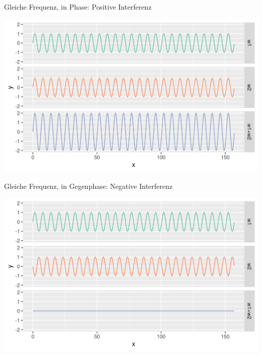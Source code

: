 \documentclass{beamer}
\begin{document}
\begin{frame}{Gleiche Frequenz, in Phase: Positive Interferenz}

\begin{center}
    \includegraphics[width=\textwidth]{positive_interferenz.png}
\end{center}
    
\end{frame}



\begin{frame}{Gleiche Frequenz, in Gegenphase: Negative Interferenz}

\begin{center}
    \includegraphics[width=\textwidth]{negative_interferenz.png}
\end{center}
    
\end{frame}
\end{document}

